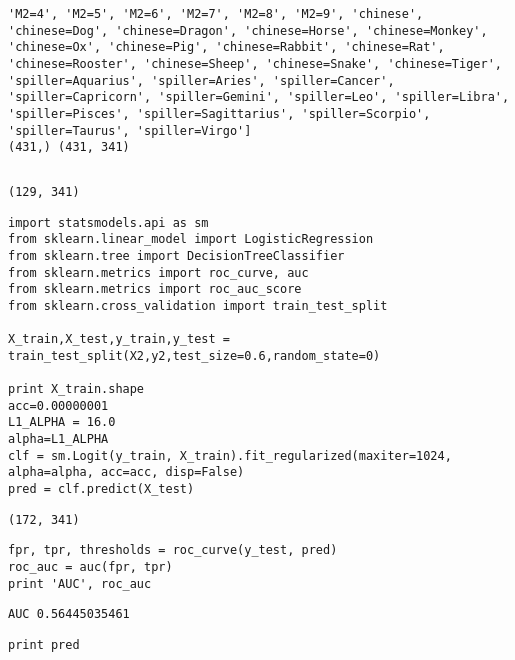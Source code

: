 \documentclass[12pt,fleqn]{article}\usepackage{../common}
\begin{document}
\begin{verbatim}
'M2=4', 'M2=5', 'M2=6', 'M2=7', 'M2=8', 'M2=9', 'chinese', 'chinese=Dog', 'chinese=Dragon', 'chinese=Horse', 'chinese=Monkey', 'chinese=Ox', 'chinese=Pig', 'chinese=Rabbit', 'chinese=Rat', 'chinese=Rooster', 'chinese=Sheep', 'chinese=Snake', 'chinese=Tiger', 'spiller=Aquarius', 'spiller=Aries', 'spiller=Cancer', 'spiller=Capricorn', 'spiller=Gemini', 'spiller=Leo', 'spiller=Libra', 'spiller=Pisces', 'spiller=Sagittarius', 'spiller=Scorpio', 'spiller=Taurus', 'spiller=Virgo']
(431,) (431, 341)
\end{verbatim}

\begin{verbatim}
\end{verbatim}

\begin{verbatim}
(129, 341)
\end{verbatim}

\begin{verbatim}
import statsmodels.api as sm
from sklearn.linear_model import LogisticRegression
from sklearn.tree import DecisionTreeClassifier
from sklearn.metrics import roc_curve, auc
from sklearn.metrics import roc_auc_score
from sklearn.cross_validation import train_test_split

X_train,X_test,y_train,y_test = train_test_split(X2,y2,test_size=0.6,random_state=0)

print X_train.shape
acc=0.00000001
L1_ALPHA = 16.0
alpha=L1_ALPHA
clf = sm.Logit(y_train, X_train).fit_regularized(maxiter=1024, alpha=alpha, acc=acc, disp=False)
pred = clf.predict(X_test)
\end{verbatim}

\begin{verbatim}
(172, 341)
\end{verbatim}

\begin{verbatim}
fpr, tpr, thresholds = roc_curve(y_test, pred)
roc_auc = auc(fpr, tpr)
print 'AUC', roc_auc
\end{verbatim}

\begin{verbatim}
AUC 0.56445035461
\end{verbatim}

\begin{verbatim}
print pred
\end{verbatim}
\end{document}
